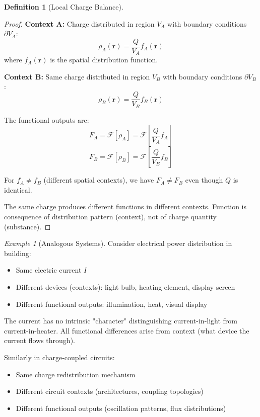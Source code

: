 \documentclass[12pt,a4paper]{article}
\theoremstyle{plain}
\theoremstyle{definition}
\newtheorem{definition}[theorem]{Definition}
\theoremstyle{remark}
\newtheorem{example}[theorem]{Example}
\begin{document}
\begin{definition}[Local Charge Balance]
\begin{proof}
\textbf{Context A:} Charge distributed in region $V_A$ with boundary conditions $\partial V_A$:
\begin{equation}
\rho_A(\mathbf{r}) = \frac{Q}{V_A} f_A(\mathbf{r})
\end{equation}
where $f_A(\mathbf{r})$ is the spatial distribution function.

\textbf{Context B:} Same charge distributed in region $V_B$ with boundary conditions $\partial V_B$:
\begin{equation}
\rho_B(\mathbf{r}) = \frac{Q}{V_B} f_B(\mathbf{r})
\end{equation}

The functional outputs are:
\begin{equation}
F_A = \mathcal{F}[\rho_A] = \mathcal{F}\left[\frac{Q}{V_A} f_A\right]
\end{equation}
\begin{equation}
F_B = \mathcal{F}[\rho_B] = \mathcal{F}\left[\frac{Q}{V_B} f_B\right]
\end{equation}

For $f_A \neq f_B$ (different spatial contexts), we have $F_A \neq F_B$ even though $Q$ is identical.

The same charge produces different functions in different contexts. Function is consequence of distribution pattern (context), not of charge quantity (substance).
\end{proof}

\begin{example}[Analogous Systems]
\label{ex:analogous}
Consider electrical power distribution in building:
\begin{itemize}
\item Same electric current $I$
\item Different devices (contexts): light bulb, heating element, display screen
\item Different functional outputs: illumination, heat, visual display
\end{itemize}

The current has no intrinsic "character" distinguishing current-in-light from current-in-heater. All functional differences arise from context (what device the current flows through).

Similarly in charge-coupled circuits:
\begin{itemize}
\item Same charge redistribution mechanism
\item Different circuit contexts (architectures, coupling topologies)
\item Different functional outputs (oscillation patterns, flux distributions)
\end{itemize}


\end{example}
\end{definition}
\end{document}
